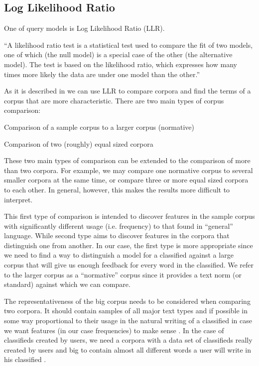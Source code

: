 \subsection{Log Likelihood Ratio}

One of query models is Log Likelihood Ratio (LLR).

``A likelihood ratio test is a statistical test used to compare the fit of two models, one of which (the null model) is a special case of the other (the alternative model). The test is based on the likelihood ratio, which expresses how many times more likely the data are under one model than the other.''

As it is described in \cite{RaysonGarside} we can use LLR to compare corpora and find the terms of a corpus that are more characteristic. There are two main types of corpus comparison:

\begin{list}{.}{}
\item Comparison of a sample corpus to a larger corpus (normative)
\item Comparison of two (roughly) equal sized corpora
\end{list}

These two main types of comparison can be extended to the comparison of more than two corpora. For example, we may compare one normative corpus to several smaller corpora at the same time, or compare three or more equal sized corpora to each other. In general, however, this makes the results more difficult to interpret.

This first type of comparison is intended to discover features in the sample corpus with significantly different usage (i.e. frequency) to that found in ``general'' language. While second type aims to discover features in the corpora that distinguish one from another. In our case, the first type is more appropriate since we need to find a way to distinguish a model for a classified against a large corpus that will give us enough feedback for every word in the classified. We refer to the larger corpus as a ``normative'' corpus since it provides a text norm (or standard) against which we can compare.

The representativeness of the big corpus needs to be considered when comparing two corpora. It should contain samples of all major text types and if possible in some way proportional to their usage in the natural writing of a classified in case we want features (in our case frequencies) to make sense . In the case of classifieds created by users, we need a corpora with a data set of classifieds really created by users and big to contain almost all different words a user will write in his classified \cite{RaysonGarside}.

